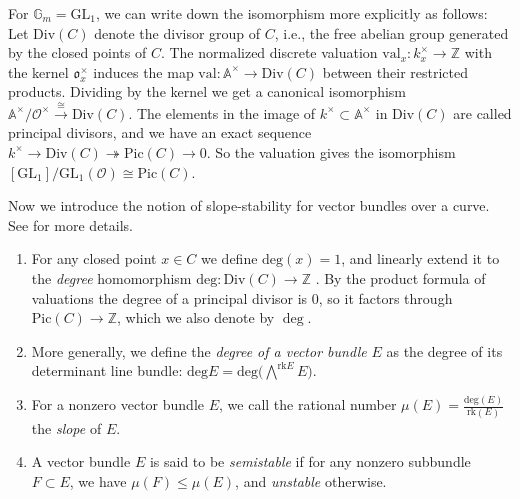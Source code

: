 For $\mathbb{G}_m = \mathrm{GL}_1$, we can write down the isomorphism more explicitly as follows: 
Let $\mathrm{Div}(C)$ denote the divisor group of $C$, i.e., the free abelian group generated by the closed points of $C$. The normalized discrete valuation $\mathrm{val}_x: k_x^\times \to \mathbb{Z}$ with the kernel $\mathfrak o_x^\times$ induces the map $\mathrm{val}: \mathbb A^\times \to \mathrm{Div}(C)$ between their restricted products. 
Dividing by the kernel we get a canonical isomorphism $\mathbb A^\times /\mathcal O^\times \xrightarrow{\cong} \mathrm{Div}(C)$. The elements in the image of $k^\times \subset \mathbb A^\times$ in $\mathrm{Div}(C)$ are called principal divisors, and we have an exact sequence $k^\times \to \mathrm{Div}(C)\twoheadrightarrow \mathrm{Pic}(C)\to 0$. So the valuation gives the isomorphism $[\mathrm{GL}_1]/\mathrm{GL}_1(\mathcal O)\cong \mathrm{Pic}(C)$.

Now we introduce the notion of slope-stability for vector bundles over a curve. See \cite[Chapter 5]{LePotier} for more details.
\begin{definition}
\label{definition-slope-stability}
\begin{enumerate}
\item For any closed point $x\in C$ we define $\mathrm{deg}(x) = 1$, and linearly extend it to the {\it degree} homomorphism $\mathrm{deg}: \mathrm{Div}(C)\to \mathbb Z$ . By the product formula of valuations the degree of a principal divisor is $0$, so it factors through $\mathrm{Pic}(C)\to \mathbb Z$, which we also denote by $\deg$. 
\item More generally, we define the {\it degree of a vector bundle} $E$ as the degree of its determinant line bundle: $\mathrm{deg} E = \mathrm{deg} \bigl(\bigwedge^{\mathrm{rk} E} E\bigr)$. 
\item For a nonzero vector bundle $E$, we call the rational number $\mu(E) = \frac{\mathrm{deg} (E)}{\mathrm{rk} (E)}$ the {\it slope} of $E$.
\item A vector bundle $E$ is said to be {\it semistable} if for any nonzero subbundle $F\subset E$, we have $\mu(F)\leq \mu(E)$, and {\it unstable} otherwise.
\end{enumerate}
\end{definition}

